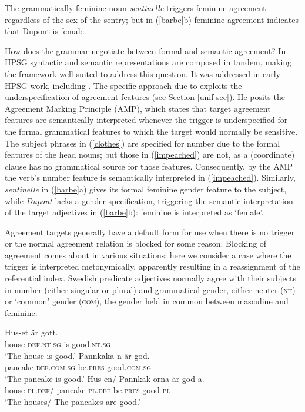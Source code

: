 \documentclass[output=paper]{langsci/langscibook}
\begin{document}
\noindent
The grammatically feminine noun \textit{sentinelle} triggers feminine agreement regardless of the sex of the sentry; but in (\ref{barbe}b) feminine agreement indicates that Dupont is female.  

How does the grammar negotiate between formal and semantic agreement?  In HPSG syntactic and semantic representations are composed in tandem, making the framework well suited to address this question.   It was addressed in early HPSG work, including \cite[ch. \ 1]{Pollard+Sag:1994}.   The specific approach due to \cite{Wechsler:2011} exploits the underspecification of agreement features (see Section \ref{unif-sec}).  He posits the Agreement Marking Principle (AMP), which states that target agreement features are semantically interpreted whenever the trigger is underspecified for the formal grammatical features to which the target would normally be sensitive.   The subject phrases in (\ref{clothes}) are specified for number due to the formal features of the head nouns; but those in (\ref{impeached}) are not, as a (coordinate) clause has no grammatical source for those features.  Consequently, by the AMP the verb's number feature is semantically interpreted in (\ref{impeached}).  Similarly, \textit{sentinelle} in (\ref{barbe}a) gives its formal feminine gender feature to the subject, while \textit{Dupont} lacks a gender specification, triggering the semantic interpretation of the target adjectives in (\ref{barbe}b):  feminine is interpreted as `female'.    

Agreement targets generally have a default form for use when there is no trigger or the normal agreement relation is blocked for some reason.   
Blocking of agreement comes about in various situations; here we  consider a case where the trigger is interpreted metonymically, apparently resulting in a reassignment of the referential index.  Swedish predicate adjectives normally agree with their subjects in number (either singular or plural) and grammatical gender, either neuter (\textsc{nt}) or `common' gender (\textsc{com}), the gender held in common between masculine and feminine: 


\begin{exe} 
\ex \label{huset}
 \begin{xlist}
\ex 
\gll 	Hus-et 	är	gott. \\
		house-\textsc{def.nt.sg}	is	good.\textsc{nt.sg} \\
\glt	‘The house is good.’
\ex   
\gll   Pannkaka-n 	är	god. \\
	pancake-\textsc{def.com.sg} 	be.\textsc{pres} 	good.\textsc{com.sg} \\
\glt	‘The pancake is good.’
\ex   
\gll   Hus-en/ Pannkak-orna 		är	god-a. \\
	   house-\textsc{pl.def}/ pancake-\textsc{pl.def} be.\textsc{pres} good-\textsc{pl}  \\
\glt	‘The houses/ The pancakes are good.’
\end{xlist}
\end{exe}
\end{document}
